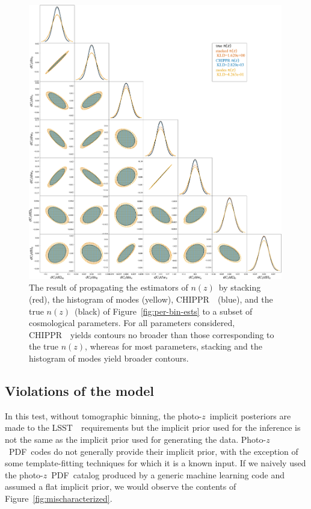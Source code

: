 \documentclass[iop]{emulateapj}
\newcommand{\Fig}[1]{Figure~\ref{#1}}
\newcommand{\project}[1]{{\textsc{#1}}~}
\newcommand{\lsst}{\project{LSST}}
\newcommand{\Chippr}{\project{CHIPPR}}
\newcommand{\nz}{$n(z)$}
\newcommand{\pz}{photo-$z$~}
\newcommand{\Pz}{Photo-$z$~}
\newcommand{\pzpdf}{\pz PDF}
\newcommand{\Pzpdf}{\Pz PDF}
\newcommand{\pzip}{\pz implicit posterior}
\begin{document}
\begin{figure}
	\begin{center}
		
\includegraphics[width=0.99\textwidth]{figures/chippr/final_plot.png}
		\caption{
			The result of propagating the estimators of \nz\ by 
stacking (red), the histogram of modes (yellow), \Chippr\ (blue), and the true 
\nz\ (black) of \Fig{fig:per-bin-ests} to a subset of cosmological parameters.
			For all parameters considered, \Chippr\ yields contours 
no broader than those corresponding to the true \nz, whereas for most 
parameters, stacking and the histogram of modes yield broader contours.
		}
		\label{fig:cornerplot}
	\end{center}
\end{figure}


\subsection{Violations of the model}
\label{sec:violations}


In this test, without tomographic binning, the \pzip s are made to the \lsst\ 
requirements but the implicit prior used for the inference is not the same as 
the implicit prior used for generating the data.
\Pzpdf\ codes do not generally provide their implicit prior, with the exception 
of some template-fitting techniques for which it is a known input.
If we naively used the \pzpdf\ catalog produced by a generic machine learning 
code and assumed a flat implicit prior, we would observe the contents of 
\Fig{fig:mischaracterized}.
\end{document}
